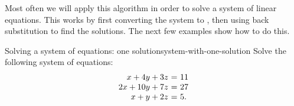 Most often we will apply this algorithm in order to solve a system of
linear equations. This works by first converting the system to {\ef},
then using back substitution to find the solutions. The next few
examples show how to do this.

\begin{example}{Solving a system of equations: one solution}{system-with-one-solution}
  Solve the following system of equations:
  \begin{equation*}
    \begin{array}{r@{~}c@{~}l}
      x + 4y + 3z &=& 11 \\
      2x + 10y + 7z &=& 27 \\
      x + y + 2z &=& 5.
    \end{array}
  \end{equation*}
\end{example}

